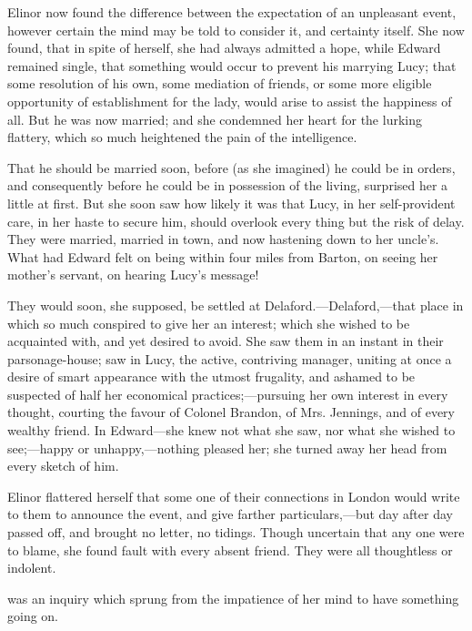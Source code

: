 Elinor now found the difference between the expectation of an unpleasant event, however certain the mind may be told to consider it, and certainty itself. She now found, that in spite of herself, she had always admitted a hope, while Edward remained single, that something would occur to prevent his marrying Lucy; that some resolution of his own, some mediation of friends, or some more eligible opportunity of establishment for the lady, would arise to assist the happiness of all. But he was now married; and she condemned her heart for the lurking flattery, which so much heightened the pain of the intelligence.

That he should be married soon, before (as she imagined) he could be in orders, and consequently before he could be in possession of the living, surprised her a little at first. But she soon saw how likely it was that Lucy, in her self-provident care, in her haste to secure him, should overlook every thing but the risk of delay. They were married, married in town, and now hastening down to her uncle's. What had Edward felt on being within four miles from Barton, on seeing her mother's servant, on hearing Lucy's message!

They would soon, she supposed, be settled at Delaford.---Delaford,---that place in which so much conspired to give her an interest; which she wished to be acquainted with, and yet desired to avoid. She saw them in an instant in their parsonage-house; saw in Lucy, the active, contriving manager, uniting at once a desire of smart appearance with the utmost frugality, and ashamed to be suspected of half her economical practices;---pursuing her own interest in every thought, courting the favour of Colonel Brandon, of Mrs. Jennings, and of every wealthy friend. In Edward---she knew not what she saw, nor what she wished to see;---happy or unhappy,---nothing pleased her; she turned away her head from every sketch of him.

Elinor flattered herself that some one of their connections in London would write to them to announce the event, and give farther particulars,---but day after day passed off, and brought no letter, no tidings. Though uncertain that any one were to blame, she found fault with every absent friend. They were all thoughtless or indolent.

 was an inquiry which sprung from the impatience of her mind to have something going on.



